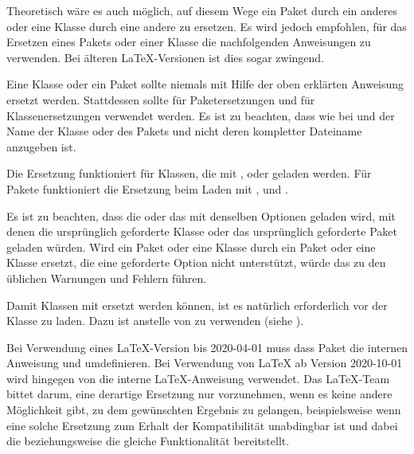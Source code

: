 Theoretisch wäre es auch möglich, auf diesem Wege ein Paket durch ein anderes
oder eine Klasse durch eine andere zu ersetzen. Es wird jedoch empfohlen, für
das Ersetzen eines Pakets oder einer Klasse die nachfolgenden Anweisungen zu
verwenden. Bei älteren \LaTeX-Versionen ist dies sogar zwingend.%
\EndIndexGroup


\begin{Declaration}
\end{Declaration}
Eine Klasse oder ein
Paket sollte niemals mit Hilfe der oben erklärten Anweisung
 ersetzt werden. Stattdessen sollte für
Paketersetzungen  und für Klassenersetzungen
 verwendet werden. Es ist zu beachten, dass wie bei
 und  der Name der Klasse oder des
Pakets und nicht deren kompletter Dateiname anzugeben ist.

Die Ersetzung funktioniert für Klassen, die mit ,
 oder  geladen werden. Für Pakete
funktioniert die Ersetzung beim Laden mit ,
 und .

Es ist zu beachten, dass die  oder das
 mit denselben Optionen geladen wird, mit denen die
ursprünglich geforderte Klasse oder das ursprünglich geforderte Paket geladen
würden. Wird ein Paket oder eine Klasse durch ein Paket oder eine Klasse
ersetzt, die eine geforderte Option nicht unterstützt, würde das zu den
üblichen Warnungen und Fehlern führen.

Damit Klassen mit  ersetzt werden können, ist es natürlich
erforderlich  vor der Klasse zu laden. Dazu ist
 anstelle von
 zu verwenden (siehe \cite{latex:clsguide}).

Bei Verwendung eines \LaTeX-Version bis
2020-04-01 muss dass Paket  die internen
Anweisung  und 
umdefinieren. Bei Verwendung von \LaTeX{} ab Version 2020-10-01 wird hingegen
von  die interne \LaTeX-Anweisung
 verwendet. Das \LaTeX{}-Team bittet darum,
eine derartige Ersetzung nur vorzunehmen, wenn es keine andere Möglichkeit
gibt, zu dem gewünschten Ergebnis zu gelangen, beispielsweise wenn eine solche
Ersetzung zum Erhalt der Kompatibilität unabdingbar ist und dabei die
 beziehungsweise  die gleiche
Funktionalität bereitstellt.%
\EndIndexGroup



